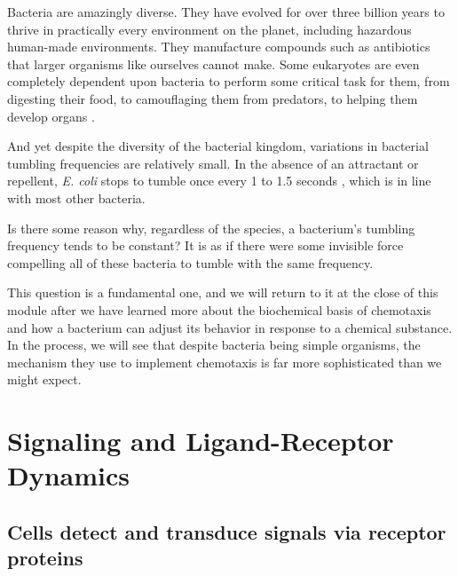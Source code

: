 Bacteria are amazingly diverse. They have evolved for over three billion years to thrive in practically every environment on the planet, including hazardous human-made environments. They manufacture compounds such as antibiotics that larger organisms like ourselves cannot make. Some eukaryotes are even completely dependent upon bacteria to perform some critical task for them, from digesting their food, to camouflaging them from predators, to helping them develop organs \citep{Yong_2016}.

And yet despite the diversity of the bacterial kingdom, variations in bacterial tumbling frequencies are relatively small. In the absence of an attractant or repellent, \textit{E. coli} stops to tumble once every 1 to 1.5 seconds \citep{Weis_1990, Berg_2000}, which is in line with most other bacteria. \citep{Achouri_2015, Turner_2016, Gotz_1987}

Is there some reason why, regardless of the species, a bacterium's tumbling frequency tends to be constant? It is as if there were some invisible force compelling all of these bacteria to tumble with the same frequency.

This question is a fundamental one, and we will return to it at the close of this module after we have learned more about the biochemical basis of chemotaxis and how a bacterium can adjust its behavior in response to a chemical substance. In the process, we will see that despite bacteria being simple organisms, the mechanism they use to implement chemotaxis is far more sophisticated than we might expect.


\begin{qbox}\end{qbox}


\FloatBarrier
{}
\section{Signaling and Ligand-Receptor Dynamics}
\label{sec:signal}

\subsection{Cells detect and transduce signals via receptor proteins}

